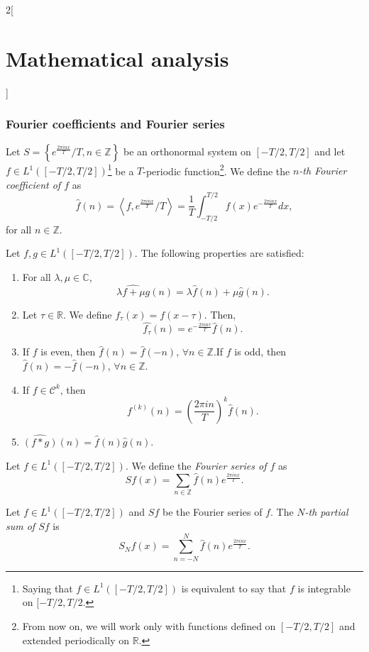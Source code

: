 \documentclass[../../../main.tex]{subfiles}
\begin{document}
\begin{multicols}{2}[\section{Mathematical analysis}]
\subsubsection*{Fourier coefficients and Fourier series}
\begin{definition}
Let $\displaystyle S=\left\{e^{\frac{2\pi inx}{T}}/T,n\in\mathbb{Z}\right\}$ be an or\-tho\-nor\-mal system on $[-T/2,T/2]$ and let $f\in L^1([-T/2,T/2])$\footnote{Saying that $f\in L^1([-T/2,T/2])$ is equivalent to say that $f$ is integrable on $[-T/2,T/2$.} be a $T$-periodic function\footnote{From now on, we will work only with functions defined on $[-T/2,T/2]$ and extended periodically on $\mathbb{R}$.}. We define the \textit{$n$-th Fourier coefficient of $f$} as $$\widehat{f}(n)=\left\langle f,e^{\frac{2\pi inx}{T}}/T\right\rangle=\frac{1}{T}\int_{-T/2}^{T/2}f(x)e^{-\frac{2\pi inx}{T}}dx,$$ for all $n\in\mathbb{Z}$.
\end{definition}
\begin{prop}
Let $f,g\in L^1([-T/2,T/2])$. The following properties are satisfied:
\begin{enumerate}
    \item For all $\lambda,\mu\in\mathbb{C}$, $$\widehat{\lambda f+\mu g}(n)=\lambda\widehat{f}(n)+\mu\widehat{g}(n).$$
    \item Let $\tau\in\mathbb{R}$. We define $f_\tau(x)=f(x-\tau)$. Then, $$\widehat{f_\tau}(n)=e^{-\frac{2\pi in\tau}{T}}\widehat{f}(n).$$
    \item If $f$ is even, then $\widehat{f}(n)=\widehat{f}(-n)$, $\forall n\in\mathbb{Z}$.\newline If $f$ is odd, then $\widehat{f}(n)=-\widehat{f}(-n)$, $\forall n\in\mathbb{Z}$. 
    \item If $f\in \mathcal{C}^k$, then $$\widehat{f^{(k)}}(n)=\left(\frac{2\pi in}{T}\right)^k\widehat{f}(n).$$
    \item $\widehat{(f*g)}(n)=\widehat{f}(n)\widehat{g}(n)$.
\end{enumerate}
\end{prop}
\begin{definition}
Let $f\in L^1([-T/2,T/2])$. We define the \textit{Fourier series of $f$} as $$\displaystyle Sf(x)=\sum_{n\in\mathbb{Z}}\widehat{f}(n)e^{\frac{2\pi inx}{T}}.$$
\end{definition}
\begin{definition}
Let $f\in L^1([-T/2,T/2])$ and $Sf$ be the Fourier series of $f$. The \textit{$N$-th partial sum of $Sf$} is $$S_Nf(x)=\sum_{n=-N}^N\widehat{f}(n)e^{\frac{2\pi inx}{T}}.$$

\end{definition}
\end{multicols}
\end{document}
